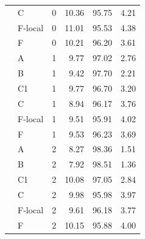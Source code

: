 \begin{longtable}{@{}llrrrr@{}}
 & C & 0 & 10.36 & 95.75 & 4.21 \\
 & F-local & 0 & 11.01 & 95.53 & 4.38 \\
 & F & 0 & 10.21 & 96.20 & 3.61 \\
\addlinespace
 & A & 1 & 9.77 & 97.02 & 2.76 \\
 & B & 1 & 9.42 & 97.70 & 2.21 \\
 & C1 & 1 & 9.77 & 96.70 & 3.20 \\
 & C & 1 & 8.94 & 96.17 & 3.76 \\
 & F-local & 1 & 9.51 & 95.91 & 4.02 \\
 & F & 1 & 9.53 & 96.23 & 3.69 \\
\addlinespace
 & A & 2 & 8.27 & 98.36 & 1.51 \\
 & B & 2 & 7.92 & 98.51 & 1.36 \\
 & C1 & 2 & 10.08 & 97.05 & 2.84 \\
 & C & 2 & 9.98 & 95.98 & 3.97 \\
 & F-local & 2 & 9.61 & 96.18 & 3.77 \\
 & F & 2 & 10.15 & 95.88 & 4.00 \\
\end{longtable}
\endgroup

